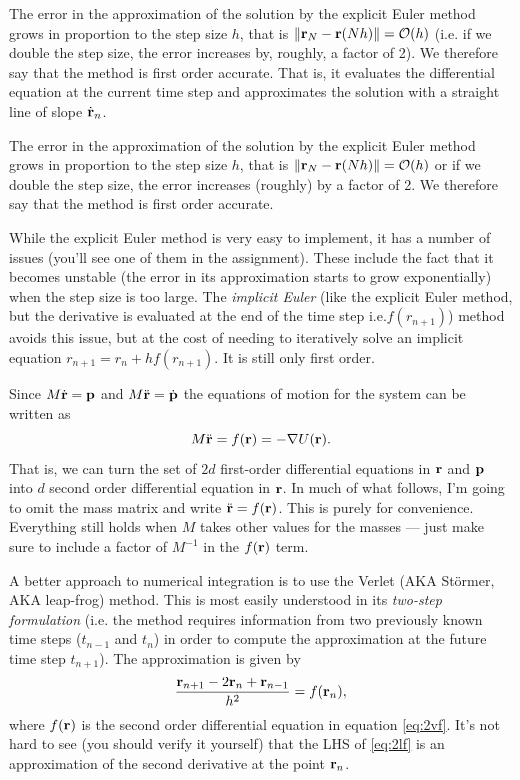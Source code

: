 \documentclass{article}
\begin{document}
The error in the approximation of the solution by the explicit Euler method grows in proportion to the step size $h$, that is $\|{\bf r}_N-{\bf r}(Nh)\|=\mathcal{O}(h)$ (i.e. if we double the step size, the error increases by, roughly, a factor of 2). We therefore say that the method is first order accurate.
That is, it evaluates the differential equation at the current time step and approximates the solution with a straight line of slope $\dot{\bf r}_n$.

The error in the approximation of the solution by the explicit Euler method grows in proportion to the step size $h$, that is $\|{\bf r}_N-{\bf r}(Nh)\|=\mathcal{O}(h)$ or if we double the step size, the error increases (roughly) by a factor of 2. We therefore say that the method is first order accurate.

While the explicit Euler method is very easy to implement, it has a number of issues (you'll see one of them in the assignment). These include the fact that it becomes unstable (the error in its approximation starts to grow exponentially) when the step size is too large. The \emph{implicit Euler} (like the explicit Euler method, but the derivative is evaluated at the end of the time step i.e.$f(r_{n+1})$) method avoids this issue, but at the cost of needing to iteratively solve an implicit equation $r_{n+1}=r_n+hf(r_{n+1})$. It is still only first order.

Since $M\dot{\bf r} = {\bf p}$ and $M\ddot{\bf r} = \dot{\bf p}$ the equations of motion for the system can be written as
\begin{equation}
	M\ddot{\bf r} = f({\bf r}) = -\nabla U({\bf r}).
	\label{eq:2vf}
\end{equation}
That is, we can turn the set of $2d$ first-order differential equations in ${\bf r}$ and ${\bf p}$ into $d$ second order differential equation in ${\bf r}$.
In much of what follows, I'm going to omit the mass matrix and write $\ddot{\bf r} = f({\bf r})$. This is purely for convenience. Everything still holds when $M$ takes other values for the masses --- just make sure to include a factor of $M^{-1}$ in the $f({\bf r})$ term.

A better approach to numerical integration is to use the Verlet (AKA St\"{o}rmer, AKA leap-frog) method. This is most easily understood in its \emph{two-step formulation} (i.e. the method requires information from two previously known time steps ($t_{n-1}$ and $t_n$) in order to compute the approximation at the future time step $t_{n+1}$). The approximation is given by 
\begin{equation}
	\frac{{\bf r}_{n+1} - 2{\bf r}_n + {\bf r}_{n-1}}{h^2} = f({\bf r}_n),
	\label{eq:2lf}
\end{equation}
where $f({\bf r})$ is the second order differential equation in equation \ref{eq:2vf}. It's not hard to see (you should verify it yourself) that the LHS of \ref{eq:2lf} is an approximation of the second derivative at the point ${\bf r}_n$.
\end{document}
